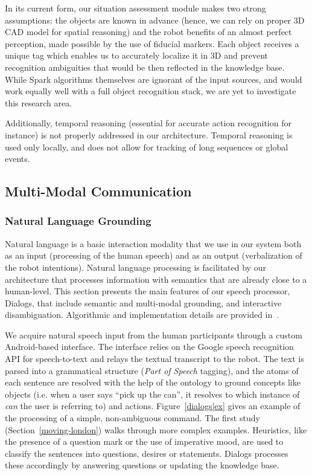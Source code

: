 \documentclass[preprint,3p,times]{elsarticle}
\newcommand{\ie}{i.e.\xspace}
\begin{document}
In its current form, our situation assessment module makes two strong
assumptions: the objects are known in advance (hence, we can rely on proper 3D
CAD model for spatial reasoning) and the robot benefits of an almost perfect
perception, made possible by the use of fiducial markers.  Each object receives
a unique tag which enables us to accurately localize it in 3D and prevent
recognition ambiguities that would be then reflected in the knowledge base.
While {\sc Spark} algorithms themselves are ignorant of the input sources, and
would work equally well with a full object recognition stack, we are yet to
investigate this research area.

Additionally, temporal reasoning (essential for accurate action recognition for
instance) is not properly addressed in our architecture. Temporal reasoning is used
only locally, and does not allow for tracking of long sequences or global events.


\subsection{Multi-Modal Communication}
\label{sect|com}

\subsubsection{Natural Language Grounding}

Natural language is a basic interaction modality that we use in our system both
as an input (processing of the human speech) and as an output (verbalization of the
robot intentions). Natural language processing is facilitated by our architecture
that processes information with semantics that are already close to a
human-level. This section presents the main features of our speech processor,
{\sc Dialogs}, that include semantic and multi-modal grounding, and interactive
disambiguation. Algorithmic and implementation details are provided
in~\cite{Lemaignan2011a}.

We acquire natural speech input from the human participants through a custom
Android-based interface. The interface relies on the Google speech recognition API for
speech-to-text and relays the textual transcript to the robot. The text is parsed into
a grammatical structure (\emph{Part of Speech} tagging), and the atoms of each
sentence are resolved with the help of the ontology to ground concepts like
objects (\ie when a user says ``pick up the can'', it resolves to which instance of
\emph{can} the user is referring to) and actions.  Figure~\ref{dialogs|ex} gives
an example of the processing of a simple, non-ambiguous command. The first
study (Section~\ref{moving-london}) walks through more complex examples.
Heuristics, like the presence of a question mark or the use of imperative mood,
are used to classify the sentences into questions, desires or statements.
{\sc Dialogs} processes these accordingly by answering questions or
updating the knowledge base.
\end{document}
